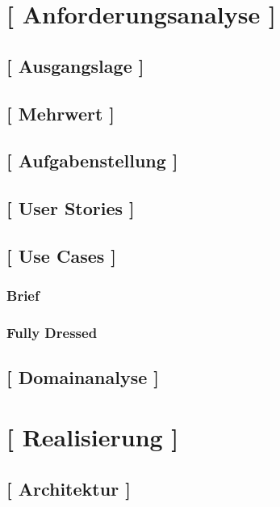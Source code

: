 \documentclass[11pt,a4paper,english,oneside]{book}
\numberwithin{equation}{chapter}
\begin{document}
\chapter{[ Anforderungsanalyse ]}

\section{[ Ausgangslage ]}

\section{[ Mehrwert ]}

\section{[ Aufgabenstellung ]}

\section{[ User Stories ]}

\section{[ Use Cases ]}

\subsection{Brief}

\subsection{Fully Dressed}

\section{[ Domainanalyse ]}




\chapter{ [ Realisierung ]}

\section{ [ Architektur ] }
\end{document}

